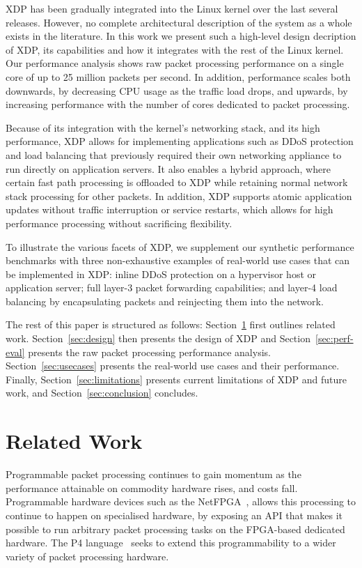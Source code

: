 \documentclass[10pt,sigconf]{acmart}
\begin{document}
XDP has been gradually integrated into the Linux kernel over the last several
releases. However, no complete architectural description of the system as a
whole exists in the literature. In this work we present such a high-level design
decription of XDP, its capabilities and how it integrates with the rest of the
Linux kernel. Our performance analysis shows raw packet processing performance
on a single core of up to 25 million packets per second. In addition,
performance scales both downwards, by decreasing CPU usage as the traffic load
drops, and upwards, by increasing performance with the number of cores dedicated
to packet processing.

Because of its integration with the kernel's networking stack, and its high
performance, XDP allows for implementing applications such as DDoS protection
and load balancing that previously required their own networking appliance to
run directly on application servers. It also enables a hybrid approach, where
certain fast path processing is offloaded to XDP while retaining normal network
stack processing for other packets. In addition, XDP supports atomic application
updates without traffic interruption or service restarts, which allows for high
performance processing without sacrificing flexibility.

To illustrate the various facets of XDP, we supplement our synthetic performance
benchmarks with three non-exhaustive examples of real-world use cases that can
be implemented in XDP: inline DDoS protection on a hypervisor host or
application server; full layer-3 packet forwarding capabilities; and layer-4
load balancing by encapsulating packets and reinjecting them into the network.

The rest of this paper is structured as follows: Section~\ref{sec:related-work}
first outlines related work. Section~\ref{sec:design} then presents the design
of XDP and Section~\ref{sec:perf-eval} presents the raw packet processing
performance analysis. Section~\ref{sec:usecases} presents the real-world use
cases and their performance. Finally, Section~\ref{sec:limitations} presents
current limitations of XDP and future work, and Section~\ref{sec:conclusion}
concludes.

\section{Related Work}%
\label{sec:related-work}

Programmable packet processing continues to gain momentum as the performance
attainable on commodity hardware rises, and costs fall. Programmable hardware
devices such as the NetFPGA~\cite{lockwood2007netfpga}, allows this processing
to continue to happen on specialised hardware, by exposing an API that makes it
possible to run arbitrary packet processing tasks on the FPGA-based dedicated
hardware. The P4 language~\cite{bosshart2014p4} seeks to extend this
programmability to a wider variety of packet processing hardware.
\end{document}
